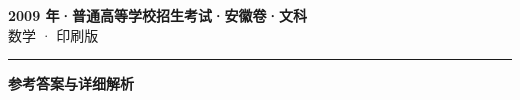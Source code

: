 \documentclass[zihao=5, a4paper]{ctexart}
\begin{document}
\begin{center}
  {\Large\bfseries 2009 年·普通高等学校招生考试·安徽卷·文科}\\[4pt]
  {\large 数学 · 印刷版}
\end{center}
\medskip
{}

\par\bigskip\hrule\bigskip
{}
\begin{center}{\large\bfseries 参考答案与详细解析}\end{center}
\smallskip

\end{document}
